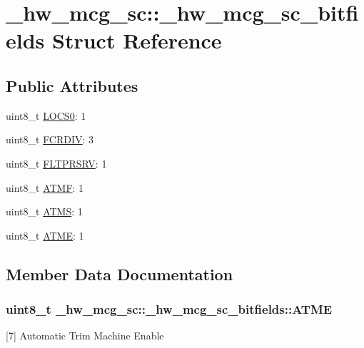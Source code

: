 \hypertarget{struct__hw__mcg__sc_1_1__hw__mcg__sc__bitfields}{}\section{\+\_\+hw\+\_\+mcg\+\_\+sc\+:\+:\+\_\+hw\+\_\+mcg\+\_\+sc\+\_\+bitfields Struct Reference}
\label{struct__hw__mcg__sc_1_1__hw__mcg__sc__bitfields}
\subsection*{Public Attributes}
\begin{DoxyCompactItemize}
\item 
uint8\+\_\+t \hyperlink{struct__hw__mcg__sc_1_1__hw__mcg__sc__bitfields_a6a1f0426bc9a88d864d1ff7521494537}{L\+O\+C\+S0}\+: 1
\item 
uint8\+\_\+t \hyperlink{struct__hw__mcg__sc_1_1__hw__mcg__sc__bitfields_a0f5e1718330d12df65882cd3a0834931}{F\+C\+R\+D\+IV}\+: 3
\item 
uint8\+\_\+t \hyperlink{struct__hw__mcg__sc_1_1__hw__mcg__sc__bitfields_aaf3f335d26f466a912349524fb802e92}{F\+L\+T\+P\+R\+S\+RV}\+: 1
\item 
uint8\+\_\+t \hyperlink{struct__hw__mcg__sc_1_1__hw__mcg__sc__bitfields_a8fa16a87895d76090654b5e7effc532e}{A\+T\+MF}\+: 1
\item 
uint8\+\_\+t \hyperlink{struct__hw__mcg__sc_1_1__hw__mcg__sc__bitfields_a1cf6a776acbeec5d53901de81cbcac48}{A\+T\+MS}\+: 1
\item 
uint8\+\_\+t \hyperlink{struct__hw__mcg__sc_1_1__hw__mcg__sc__bitfields_a5100c7d4f52e7c5ed8977ca7ea63acb7}{A\+T\+ME}\+: 1
\end{DoxyCompactItemize}


\subsection{Member Data Documentation}
\subsubsection[{\texorpdfstring{A\+T\+ME}{ATME}}]{\setlength{\rightskip}{0pt plus 5cm}uint8\+\_\+t \+\_\+hw\+\_\+mcg\+\_\+sc\+::\+\_\+hw\+\_\+mcg\+\_\+sc\+\_\+bitfields\+::\+A\+T\+ME}\hypertarget{struct__hw__mcg__sc_1_1__hw__mcg__sc__bitfields_a5100c7d4f52e7c5ed8977ca7ea63acb7}{}\label{struct__hw__mcg__sc_1_1__hw__mcg__sc__bitfields_a5100c7d4f52e7c5ed8977ca7ea63acb7}
\mbox{[}7\mbox{]} Automatic Trim Machine Enable 
